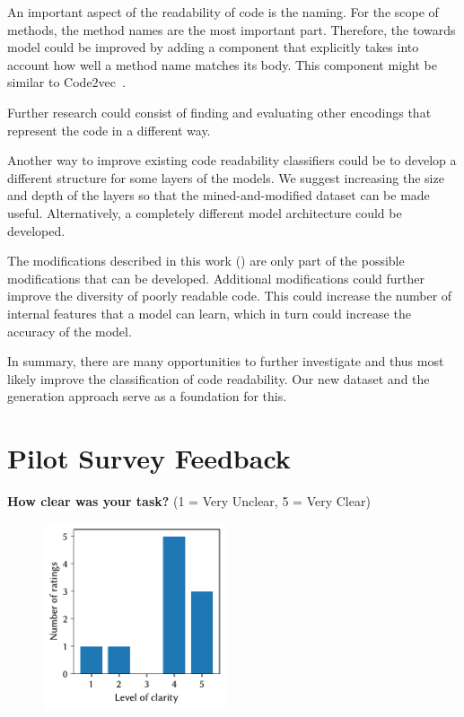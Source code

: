 \documentclass[%
class=scrreprt,
chapterprefix=false,%
open=right,%
twoside=false,%
paper=a4,%
logofile={Logo\_zentral\_farbig\_EN.png},%
thesistype=master,%
UKenglish,%
]{se2thesis}
\renewcommand{\thesection}{\arabic{section}}
\renewcommand{\thechapter}{\arabic{chapter}.0}
\theoremstyle{definition}
\begin{document}
	An important aspect of the readability of code is the naming. For the scope of methods, the method names are the most important part. Therefore, the towards model could be improved by adding a component that explicitly takes into account how well a method name matches its body. This component might be similar to Code2vec~\cite{alon2019code2vec}.
	
	Further research could consist of finding and evaluating other encodings that represent the code in a different way.
	
	Another way to improve existing code readability classifiers could be to develop a different structure for some layers of the models. We suggest increasing the size and depth of the layers so that the mined-and-modified dataset can be made useful. Alternatively, a completely different model architecture could be developed. 
	
	The modifications described in this work () are only part of the possible modifications that can be developed. Additional modifications could further improve the diversity of poorly readable code. This could increase the number of internal features that a model can learn, which in turn could increase the accuracy of the model.
	
	In summary, there are many opportunities to further investigate and thus most likely improve the classification of code readability. Our new dataset and the generation approach serve as a foundation for this.
	
\authorshipDeclaration
	
\backmatter

\printbibliography	
	\appendix
	\renewcommand{\thechapter}{\alph{chapter}}
	\renewcommand{\thesection}{\Roman{section}}
	\renewcommand{\thesubsection}{\fnsymbol{subsection}}
	
\pagebreak
\section{Pilot Survey Feedback}\label{appendix:pilot-survey-feedback}

	\textbf{How clear was your task?} (1 = Very Unclear, 5 = Very Clear)
	\begin{figure}[h!]
		\centering
		\includegraphics[width=0.48\textwidth]{img/pilot_survey_task_clearness.pdf}
		\label{fig:pilot-task-clear}
	\end{figure}
	
\end{document}
